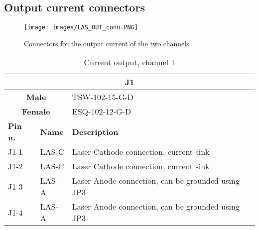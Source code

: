 \subsection{Output current connectors}

\begin{figure}[h]
    \centering
    \texttt{[image: images/LAS\_OUT\_conn.PNG]}
    \caption{Connectors for the output current of the two channels}
    \label{output_conn}
\end{figure}

\begin{table}[H]
    \begin{center}
        \begin{tabular}{
        |p{2cm}
        |>{\centering\arraybackslash}p{2cm}
        |>{\centering\arraybackslash}p{10cm}
        |  }
        \hline
            \multicolumn{3}{|c|}{\textbf{J1}}  \\
        \hline
        \hline
            \multicolumn{2}{|c|}{\textbf{Male}}  & TSW-102-15-G-D\\
        \hline
            \multicolumn{2}{|c|}{\textbf{Female}}  & ESQ-102-12-G-D\\
        \hline
        \hline        
            \textbf{Pin n.} & \textbf{Name} & \textbf{Description}\\
        \hline
            J1-1 & LAS-C & Laser Cathode connection, current sink \\
        \hline
            J1-2 & LAS-C & Laser Cathode connection, current sink \\
        \hline
            J1-3 & LAS-A & Laser Anode connection, can be grounded using JP3 \\
        \hline
            J1-4 & LAS-A & Laser Anode connection, can be grounded using JP3 \\
        \hline
        \end{tabular}
    \caption{Current output, channel 1}
    \end{center}
\end{table}



